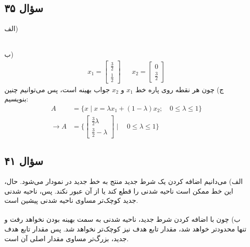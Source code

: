 \subsection*{سؤال ۳۵}
الف)
\\ ب)
\begin{align*}
  x_{1} =
  \begin{bmatrix}
    \frac{3}{2} \\
    \frac{1}{2}
  \end{bmatrix} &&
  x_{2} =
  \begin{bmatrix}
    0 \\
    \frac{3}{2}
  \end{bmatrix}
\end{align*}
ج) چون هر نقطه روی پاره خط $x_{1}$ و $x_{2}$ جواب بهینه است، پس می‌توانیم چنین بنویسیم:
\begin{align*}
  A &= \{x \mid x = \lambda x_{1} + (1 - \lambda)x_{2};
  \quad 0 \leq \lambda \leq 1 \} \\
  \to A &= \{
      \begin{bmatrix}
        \frac{3}{2}\lambda \\
        \frac{3}{2} - \lambda
      \end{bmatrix}
  \mid \quad 0 \leq \lambda \leq 1 \}
\end{align*}


\subsection*{سؤال ۴۱}
الف) می‌دانیم اضافه کردن یک شرط جدید منتج به خط جدید در نمودار می‌شود. حال، این خط ممکن است ناحیه شدنی را قطع کند یا از آن عبور نکند. پس، ناحیه شدنی جدید کوچک‌تر مساوی ناحیه شدنی پیشین است. \\ \\
ب) چون با اضافه کردن شرط جدید، ناحیه شدنی به سمت بهینه بودن نخواهد رفت و تنها محدودتر خواهد شد، مقدار تابع هدف نیز کوچک‌تر نخواهد شد. پس مقدار تابع هدف جدید، بزرگ‌تر مساوی مقدار اصلی آن است.

